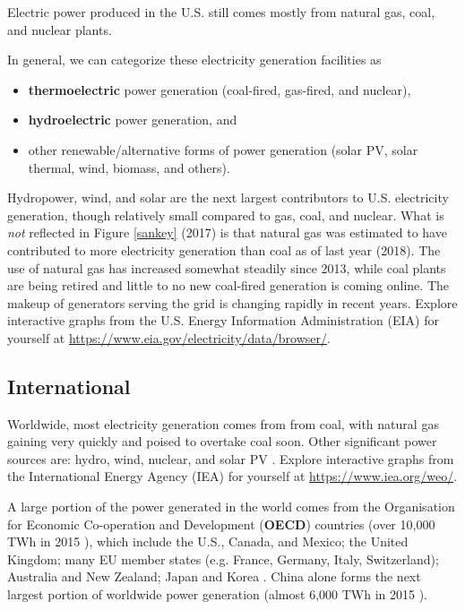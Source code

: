 \documentclass[10pt]{article}
\begin{document}
\smallskip

Electric power produced in the U.S. still comes mostly from natural gas, coal, and nuclear plants. 

In general, we can categorize these electricity generation facilities as

\begin{itemize}
    \item \textbf{thermoelectric} power generation (coal-fired, gas-fired, and nuclear),
    \item \textbf{hydroelectric} power generation, and
    \item other renewable/alternative forms of power generation (solar PV, solar thermal, wind, biomass, and others).
\end{itemize}

Hydropower, wind, and solar are the next largest contributors to U.S. electricity generation, though relatively small compared to gas, coal, and nuclear. What is \textit{not} reflected in Figure \ref{sankey} (2017) is that natural gas was estimated to have contributed to more electricity generation than coal as of last year (2018). The use of natural gas has increased somewhat steadily since 2013, while coal plants are being retired and little to no new coal-fired generation is coming online. The makeup of generators serving the grid is changing rapidly in recent years. Explore interactive graphs from the U.S. Energy Information Administration (EIA) for yourself at \url{https://www.eia.gov/electricity/data/browser/}.

\subsection{International}

Worldwide, most electricity generation comes from from coal, with natural gas gaining very quickly and poised to overtake coal soon. Other significant power sources are: hydro, wind, nuclear, and solar PV \cite{noauthor_undated-ge}. Explore interactive graphs from the International Energy Agency (IEA) for yourself at \url{https://www.iea.org/weo/}.

A large portion of the power generated in the world comes from the Organisation for Economic Co-operation and Development (\textbf{OECD}) countries (over 10,000 TWh in 2015 \cite{noauthor_undated-gz}), which include the U.S., Canada, and Mexico; the United Kingdom; many EU member states (e.g.  France, Germany, Italy, Switzerland); Australia and New Zealand; Japan and Korea \cite{noauthor_undated-yg}. China alone forms the next largest portion of worldwide power generation (almost 6,000 TWh in 2015 \cite{noauthor_undated-gz}).
\end{document}
